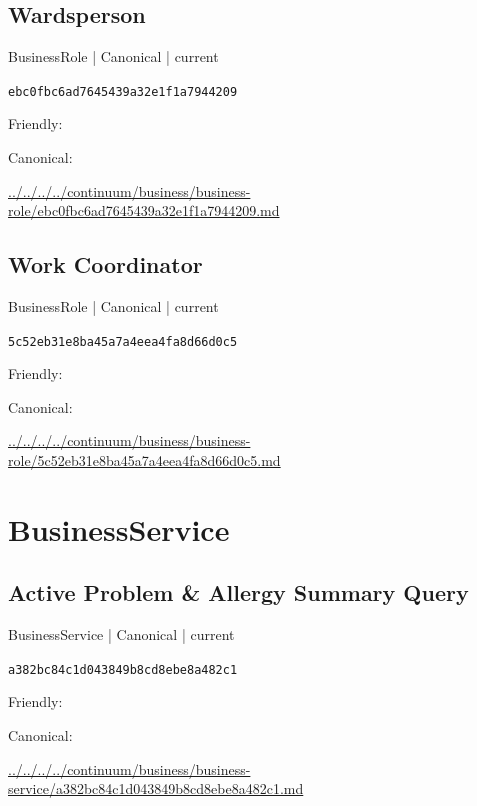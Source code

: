 \documentclass[10pt,a4paper]{article}
\begin{document}
\subsection*{Wardsperson}
{\small BusinessRole | Canonical | current}\par
\texttt{ebc0fbc6ad7645439a32e1f1a7944209}\par
Friendly: \par
Canonical: \par
{\footnotesize\url{../../../../continuum/business/business-role/ebc0fbc6ad7645439a32e1f1a7944209.md}}\par
\subsection*{Work Coordinator}
{\small BusinessRole | Canonical | current}\par
\texttt{5c52eb31e8ba45a7a4eea4fa8d66d0c5}\par
Friendly: \par
Canonical: \par
{\footnotesize\url{../../../../continuum/business/business-role/5c52eb31e8ba45a7a4eea4fa8d66d0c5.md}}\par
\section*{BusinessService}
\subsection*{Active Problem \& Allergy Summary Query}
{\small BusinessService | Canonical | current}\par
\texttt{a382bc84c1d043849b8cd8ebe8a482c1}\par
Friendly: \par
Canonical: \par
{\footnotesize\url{../../../../continuum/business/business-service/a382bc84c1d043849b8cd8ebe8a482c1.md}}\par
\end{document}
